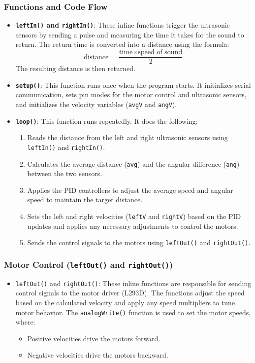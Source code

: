 \documentclass[a4paper,12pt]{./article}
\begin{document}
\subsubsection{Functions and Code Flow}
\begin{itemize}
\item \textbf{\texttt{leftIn()} and \texttt{rightIn()}}: These inline functions trigger the ultrasonic sensors by sending a pulse and measuring the time it takes for the sound to return. The return time is converted into a distance using the formula:
\[
\text{distance} = \frac{\text{time} \times \text{speed of sound}}{2}
\]
The resulting distance is then returned.
\item \textbf{\texttt{setup()}}: This function runs once when the program starts. It initializes serial communication, sets pin modes for the motor control and ultrasonic sensors, and initializes the velocity variables (\texttt{avgV} and \texttt{angV}).
\item \textbf{\texttt{loop()}}: This function runs repeatedly. It does the following:
\begin{enumerate}
\item Reads the distance from the left and right ultrasonic sensors using \texttt{leftIn()} and \texttt{rightIn()}.
\item Calculates the average distance (\texttt{avg}) and the angular difference (\texttt{ang}) between the two sensors.
\item Applies the PID controllers to adjust the average speed and angular speed to maintain the target distance.
\item Sets the left and right velocities (\texttt{leftV} and \texttt{rightV}) based on the PID updates and applies any necessary adjustments to control the motors.
\item Sends the control signals to the motors using \texttt{leftOut()} and \texttt{rightOut()}.
\end{enumerate}
\end{itemize}
\subsubsection{Motor Control (\texttt{leftOut()} and \texttt{rightOut()})}
\begin{itemize}
\item \texttt{leftOut()} and \texttt{rightOut()}: These inline functions are responsible for sending control signals to the motor driver (L293D). The functions adjust the speed based on the calculated velocity and apply any speed multipliers to tune motor behavior. The \texttt{analogWrite()} function is used to set the motor speeds, where:
\begin{itemize}
\item Positive velocities drive the motors forward.
\item Negative velocities drive the motors backward.
\end{itemize}
\end{itemize}
\end{document}
